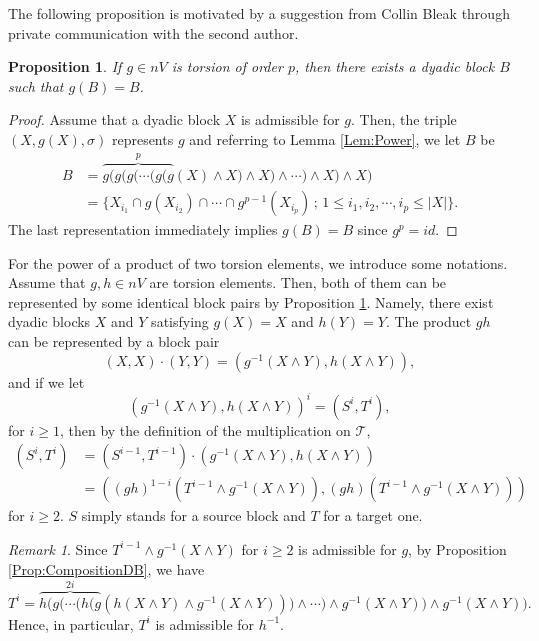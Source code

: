\documentclass[12pt,reqno]{amsart}
\theoremstyle{plain}
\newtheorem{proposition}[theorem]{Proposition}
\theoremstyle{definition}
\theoremstyle{remark}
\newtheorem{remark}{Remark}[section]
\numberwithin{equation}{section}
\begin{document}
The following proposition is motivated by 
a suggestion from Collin Bleak through private communication with the second author.  

\begin{proposition}\label{Prop:IdenticalBrock} 
 	If $g \in nV$  is torsion of order  $p$,
	then there exists a dyadic block  $B$ 
	such that  $g(B) = B$. 
\end{proposition} 
\begin{proof} 
	Assume that a dyadic block  $X$  is admissible for  $g$.  
	Then,  
	the triple  $(X, g(X), \sigma)$  represents  $g$  and 
	referring to Lemma \ref{Lem:Power}, 
	we let  $B$  be  
	\begin{align*}
		B & = 
		\overbrace{g(g(g( \cdots (g(g}^{p}
		(X) \wedge X) \wedge X)\wedge \cdots ) \wedge X) \wedge X) \\
		& = \{ X_{i_1} \cap g(X_{i_2}) \cap \cdots \cap 
		                      g^{p-1}(X_{i_p})   \, ; \, 
			1 \leq i_1, i_2, \cdots, i_p \leq |X| \}.  
	\end{align*} 
	The last representation immediately implies  $g(B) = B$  since  $g^p = id$.  
\end{proof} 

For the power of a product of two torsion elements, 
we introduce some notations.  
Assume that  $g, h \in nV$  are torsion elements.  
Then, 
both of them can be represented by some identical block pairs  
by Proposition \ref{Prop:IdenticalBrock}.  
Namely, 
there exist dyadic blocks  $X$  and  $Y$  satisfying 
$g(X) = X$  and  $h(Y) = Y$.  
The product  $gh$  can be represented by a block pair 
\begin{equation*} 
	(X, X) \cdot (Y, Y) 
	= (g^{-1} (X \wedge Y), h(X \wedge Y)), 
\end{equation*} 
and if we let 
\begin{equation*} 
	(g^{-1} (X \wedge Y), h(X \wedge Y))^i
	= (S^i,T^i),    
\end{equation*} 
for  $i \geq 1$, 
then by the definition of the multiplication on  $\mathcal{T}$,  
\begin{align*} 
	(S^{i}, T^{i}) & = (S^{i-1}, T^{i-1}) \cdot (g^{-1}(X \wedge Y), h(X \wedge Y)) \\
	& = ((gh)^{1-i}(T^{i-1} \wedge g^{-1}(X \wedge Y)), (gh)(T^{i-1} \wedge g^{-1}(X \wedge Y)))  
\end{align*} 
for  $i \geq 2$.   
$S$  simply stands for a source block and  $T$ for a target one.  
	
\begin{remark}\label{Rm:Tadmissible}  
	Since  $T^{i-1} \wedge g^{-1}(X \wedge Y)$  for  $i \geq 2$  is 
	admissible for  $g$,  
	by Proposition \ref{Prop:CompositionDB}, 
	we have 
	\begin{equation*} 
		T^i
		= \overbrace{h(g( \cdots (h(g}^{2i}(h(X \wedge Y) \wedge g^{-1} (X \wedge Y))) \wedge \cdots ) 
		\wedge g^{-1} (X \wedge Y)) \wedge g^{-1} (X \wedge Y)).  
	\end{equation*} 
	Hence, in particular,  
	$T^i$  is admissible for  $h^{-1}$.  
\end{remark} 
	
\end{document}

